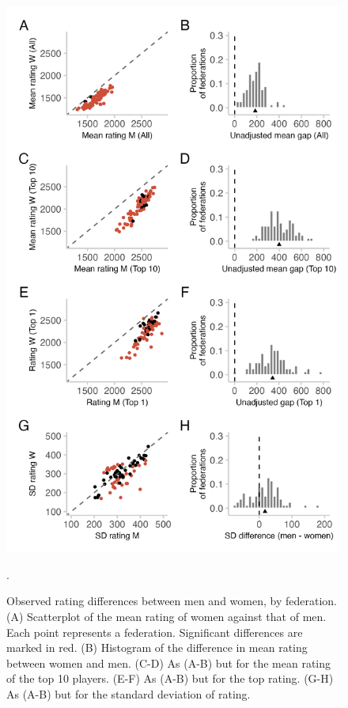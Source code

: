 \documentclass[9pt,twocolumn,twoside,lineno]{pnas-new}
\begin{document}
  \begin{figure}[!ht]
     \centering
     \includegraphics[width = \linewidth]{fig_2_w_jun_no_ina.png}
     \caption{Observed rating differences between men and women,  by federation. (A) Scatterplot of the mean rating of women against that of men. Each point represents a federation. Significant differences are marked in red. (B) Histogram of the difference in mean rating between women and men. (C-D) As (A-B) but for the mean rating of the top 10 players. (E-F) As (A-B) but for the top rating. (G-H) As (A-B) but for the standard deviation of rating.}. 
     \label{fig:federation-differences}
 \end{figure}
\end{document}
